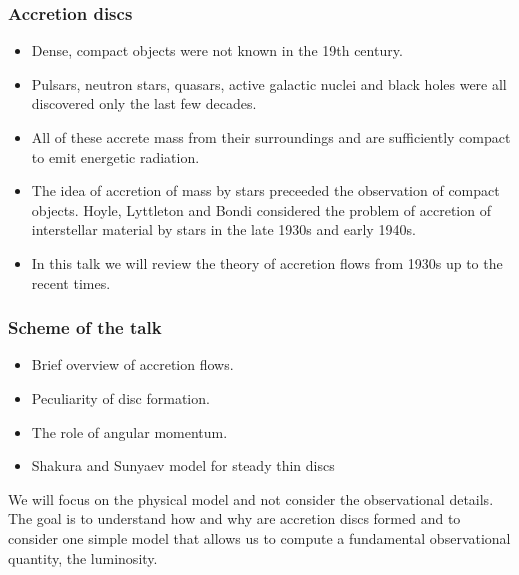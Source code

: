 \documentclass{beamer}
\begin{document}
\begin{frame}
\frametitle{Accretion discs}
\begin{itemize}
\item Dense, compact objects were not known in the 19th century.
\item Pulsars, neutron stars, quasars, active galactic nuclei and black holes were all discovered only the last few decades.
\item All of these accrete mass from their surroundings and are sufficiently compact to emit energetic radiation.
\item The idea of accretion of mass by stars preceeded the observation of compact objects. Hoyle, Lyttleton and Bondi considered
the problem of accretion of interstellar material by stars in the late 1930s and early 1940s.
\item In this talk we will review the theory of accretion flows from 1930s up to the recent times.
\end{itemize}
\end{frame}

\begin{frame}
\frametitle{Scheme of the talk}
\begin{itemize}
\item Brief overview of accretion flows.
\item Peculiarity of disc formation.
\item The role of angular momentum.
\item Shakura and Sunyaev model for steady thin discs
\end{itemize}
We will focus on the physical model and not consider the observational details. The goal is to understand how and why are accretion discs formed and to 
consider one simple model that allows us to compute a fundamental observational quantity, the luminosity.
\end{frame}
\end{document}
